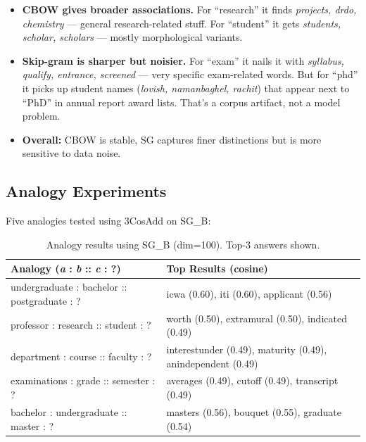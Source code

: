 \documentclass[11pt,a4paper]{article}
\begin{document}
\begin{itemize}[leftmargin=1.5em]
  \item \textbf{CBOW gives broader associations.} For ``research'' it finds \textit{projects, drdo, chemistry} --- general research-related stuff. For ``student'' it gets \textit{students, scholar, scholars} --- mostly morphological variants.
  \item \textbf{Skip-gram is sharper but noisier.} For ``exam'' it nails it with \textit{syllabus, qualify, entrance, screened} --- very specific exam-related words. But for ``phd'' it picks up student names (\textit{lovish, namanbaghel, rachit}) that appear next to ``PhD'' in annual report award lists. That's a corpus artifact, not a model problem.
  \item \textbf{Overall:} CBOW is stable, SG captures finer distinctions but is more sensitive to data noise.
\end{itemize}

\subsection{Analogy Experiments}

Five analogies tested using 3CosAdd on SG\_B:

\begin{table}[H]
\centering
\caption{Analogy results using SG\_B (dim=100). Top-3 answers shown.}
\renewcommand{\arraystretch}{1.35}
\small
{}
\begin{tabularx}{\textwidth}{lX}
\toprule
\textbf{Analogy (\textit{a} : \textit{b} :: \textit{c} : ?)} & \textbf{Top Results (cosine)} \\
\midrule
undergraduate : bachelor :: postgraduate : ?
  & icwa (0.60), iti (0.60), applicant (0.56) \\
professor : research :: student : ?
  & worth (0.50), extramural (0.50), indicated (0.49) \\
department : course :: faculty : ?
  & interestunder (0.49), maturity (0.49), anindependent (0.49) \\
examinations : grade :: semester : ?
  & averages (0.49), cutoff (0.49), transcript (0.49) \\
bachelor : undergraduate :: master : ?
  & masters (0.56), bouquet (0.55), graduate (0.54) \\
\bottomrule
\end{tabularx}
\label{tab:analogies}
\end{table}
\end{document}

